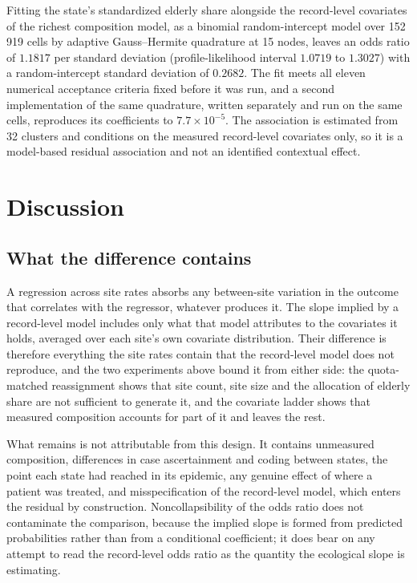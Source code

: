 \documentclass[11pt]{article}
\begin{document}
Fitting the state's standardized elderly share alongside the
record-level covariates of the richest composition model, as a binomial
random-intercept model over 152\,919 cells by adaptive Gauss--Hermite
quadrature at 15 nodes, leaves an odds ratio of $1.1817$ per standard
deviation (profile-likelihood interval $1.0719$ to $1.3027$) with a
random-intercept standard deviation of $0.2682$.  The fit meets all
eleven numerical acceptance criteria fixed before it was run, and a
second implementation of the same quadrature, written separately and
run on the same cells, reproduces its coefficients to
$7.7\times10^{-5}$.  The association is estimated from 32 clusters and conditions
on the measured record-level covariates only, so it is a model-based
residual association and not an identified contextual effect.

\section{Discussion}

\subsection{What the difference contains}
\label{sec:why}

A regression across site rates absorbs any between-site variation in the
outcome that correlates with the regressor, whatever produces it.  The
slope implied by a record-level model includes only what that model
attributes to the covariates it holds, averaged over each site's own
covariate distribution.  Their difference is therefore everything the
site rates contain that the record-level model does not reproduce, and
the two experiments above bound it from either side: the quota-matched
reassignment shows that site count, site size and the allocation of
elderly share are not sufficient to generate it, and the covariate
ladder shows that measured composition accounts for part of it and
leaves the rest.

What remains is not attributable from this design.  It contains
unmeasured composition, differences in case ascertainment and coding
between states, the point each state had reached in its epidemic, any
genuine effect of where a patient was treated, and misspecification of
the record-level model, which enters the residual by construction.
Noncollapsibility of the odds ratio
\cite{greenland1999noncollapsibility} does not contaminate the
comparison, because the implied slope is formed from predicted
probabilities rather than from a conditional coefficient; it does bear
on any attempt to read the record-level odds ratio as the quantity the
ecological slope is estimating.
\end{document}
